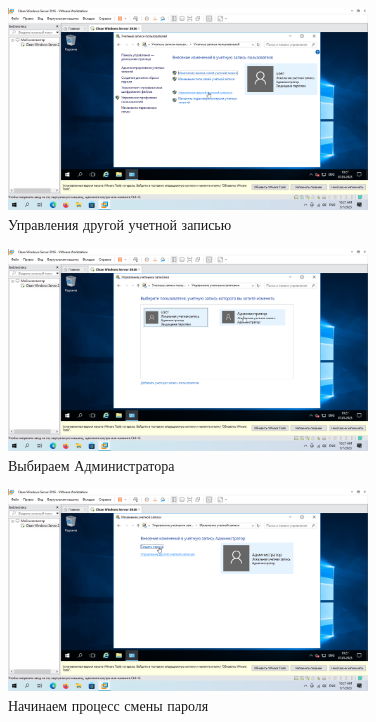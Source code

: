 \documentclass[a4paper]{article}
\begin{document}
  \begin{figure}[H]
    \centering
    \includegraphics[width=0.85\textwidth]{9_0026}
    \caption{Управления другой учетной записью}
    \label{img:0026}
  \end{figure}

  \begin{figure}[H]
    \centering
    \includegraphics[width=0.85\textwidth]{9_0027}
    \caption{Выбираем Администратора}
    \label{img:0027}
  \end{figure}

  \begin{figure}[H]
    \centering
    \includegraphics[width=0.85\textwidth]{9_0028}
    \caption{Начинаем процесс смены пароля}
    \label{img:0028}
  \end{figure}
\end{document}

